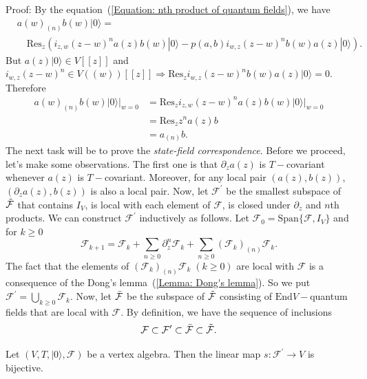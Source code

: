 Proof: By the equation~(\ref{Equation: nth product of quantum fields}), we have
\begin{equation}
\begin{split}
     &a(w)_{(n)}b(w)|0\rangle=\\
     &\quad\text{Res}_z  (i_{z,w}(z-w)^na(z)b(w)|0\rangle-p(a,b)i_{w,z}(z-w)^nb(w)a(z)|0\rangle).
\end{split}
\end{equation}
But $a(z)|0\rangle\in V[[z]]$ and $i_{w,z}(z-w)^n\in V((w))[[z]]\Rightarrow \text{Res}_zi_{w,z}(z-w)^nb(w)a(z)|0\rangle=0$. Therefore
\begin{equation}
    \begin{split}
        a(w)_{(n)}b(w)|0\rangle\big|_{w=0}&=\text{Res}_zi_{z,w}(z-w)^na(z)b(w)|0\rangle\big|_{w=0}\\
        &=\text{Res}_zz^na(z)b\\
        &=a_{(n)}b.
    \end{split}
\end{equation}
The next task will be to prove the \textit{state-field correspondence}. Before we proceed, let's make some observations. The first one is that $\partial_za(z)$ is $T-$covariant whenever $a(z)$ is $T-$covariant. Moreover, for any local pair $(a(z),b(z))$, $(\partial_za(z),b(z))$ is also a local pair. Now, let $\mathcal{F}^\prime$ be the smallest subspace of $\Tilde{\mathcal{F}}$ that contains $I_V$, is local with each element of $\mathcal{F}$, is closed under $\partial_z$ and $n$th products. We can construct $\mathcal{F}^\prime$ inductively as follows. Let $\mathcal{F}_0=\text{Span}\{\mathcal{F},I_V\}$ and for $k\geq0$
\begin{equation}
\mathcal{F}_{k+1}=\mathcal{F}_k+\sum_{n\geq0}\partial_z^n\mathcal{F}_k+\sum_{n\geq0}(\mathcal{F}_k)_{(n)}\mathcal{F}_k.
\end{equation}
The fact that the elements of $(\mathcal{F}_k)_{(n)}\mathcal{F}_k\;(k\geq0)$ are local with $\mathcal{F}$ is a consequence of the Dong's lemma~(\ref{Lemma: Dong's lemma}). So we put $\mathcal{F}^\prime=\bigcup_{k\geq0}\mathcal{F}_k$. Now, let $\Bar{\mathcal{F}}$ be the subspace of $\Tilde{\mathcal{F}}$ consisting of $\text{End}V-$quantum fields that are local with $\mathcal{F}$. By definition, we have the sequence of inclusions
\begin{equation}
    \mathcal{F}\subset\mathcal{F}^\prime\subset\Bar{\mathcal{F}}\subset\Tilde{\mathcal{F}}.
\end{equation}
\begin{dang}
    \begin{theorem}\label{Theorem: state field correspondence}\cite{de2006finite}
        Let $(V,T,|0\rangle,\mathcal{F})$ be a vertex algebra. Then the linear map $s:\mathcal{F}^\prime\rightarrow V$ is bijective.
    \end{theorem}
\end{dang}
